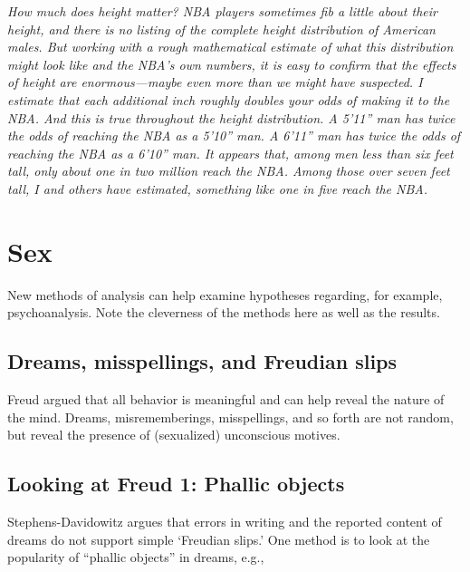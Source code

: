 \documentclass[]{book}
\theoremstyle{definition}
\theoremstyle{definition}
\theoremstyle{definition}
\theoremstyle{remark}
\begin{document}
\emph{How much does height matter? NBA players sometimes fib a little
about their height, and there is no listing of the complete height
distribution of American males. But working with a rough mathematical
estimate of what this distribution might look like and the NBA's own
numbers, it is easy to confirm that the effects of height are
enormous---maybe even more than we might have suspected. I estimate that
each additional inch roughly doubles your odds of making it to the NBA.
And this is true throughout the height distribution. A 5'11'' man has
twice the odds of reaching the NBA as a 5'10'' man. A 6'11'' man has
twice the odds of reaching the NBA as a 6'10'' man. It appears that,
among men less than six feet tall, only about one in two million reach
the NBA. Among those over seven feet tall, I and others have estimated,
something like one in five reach the NBA.}

\section{Sex}\label{sex}

New methods of analysis can help examine hypotheses regarding, for
example, psychoanalysis. Note the cleverness of the methods here as well
as the results.

\subsection{Dreams, misspellings, and Freudian
slips}\label{dreams-misspellings-and-freudian-slips}

Freud argued that all behavior is meaningful and can help reveal the
nature of the mind. Dreams, misrememberings, misspellings, and so forth
are not random, but reveal the presence of (sexualized) unconscious
motives.

\subsection{Looking at Freud 1: Phallic
objects}\label{looking-at-freud-1-phallic-objects}

Stephens-Davidowitz argues that errors in writing and the reported
content of dreams do not support simple `Freudian slips.' One method is
to look at the popularity of ``phallic objects'' in dreams, e.g.,
\end{document}
